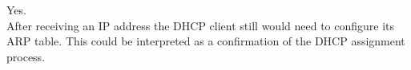 Yes. \\
After receiving an IP address the DHCP client still would need to configure its ARP table. This could be interpreted as a confirmation of the DHCP assignment process.
